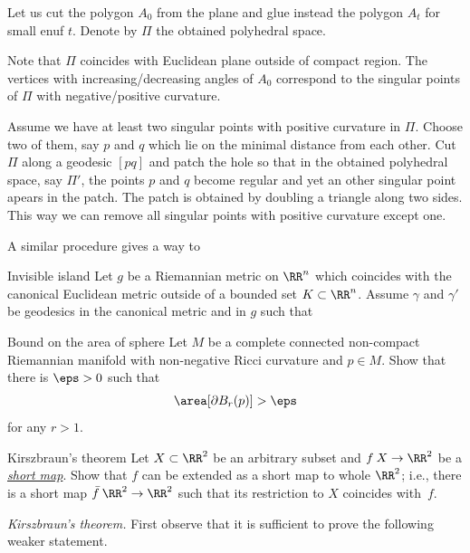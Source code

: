 Let us cut the polygon $A_0$ from the plane and glue instead the polygon $A_t$ for small enuf $t$.
Denote by $\Pi$ the obtained polyhedral space.

Note that 
$\Pi$ coincides with Euclidean plane outside of compact region.
The vertices with increasing/decreasing angles of $A_0$ 
correspond to the singular points of $\Pi$ with negative/positive curvature.

Assume we have at least two singular points with positive curvature in $\Pi$.
Choose two of them, 
say $p$ and $q$ which lie on the minimal distance from each other. 
Cut $\Pi$ along a geodesic $[pq]$
and patch the hole 
so that in the obtained polyhedral space, say $\Pi'$, 
the points $p$ and $q$ become regular and yet an other singular point apears in the patch. 
The patch is obtained by doubling a triangle along  two sides.
This way we can remove all singular points with positive curvature except one.

A similar procedure gives a way to 










\begin{pr}{}{Invisible island}
Let $g$ be a Riemannian metric on $\RR^n$ which coincides with the canonical Euclidean metric outside of a bounded set $K\subset \RR^n$.
Assume $\gamma$ and $\gamma'$ be geodesics in the canonical metric and in $g$
such that
\end{pr}





\begin{pr}{}{Bound on the area of sphere}
Let $M$ be a complete connected non-compact Riemannian manifold with non-negative Ricci curvature and $p\in M$.
Show that there is $\eps>0$ such that
$$\area [\partial B_r(p)]>\eps$$
for any $r>1$.
\end{pr}










\begin{pr}{}{Kirszbraun's theorem}\label{kirszbrun}
Let $X\subset\RR^2$ be an arbitrary subset and $f\:X\to\RR^2$ be a \hyperref[Short map]{\emph{short map}}.
Show that $f$ can be extended as a short map to whole $\RR^2$;
i.e., there is a short map $\bar f\:\RR^2\to\RR^2$ such that its restriction to $X$ coincides with~$f$.
\end{pr}
\textit{Kirszbraun's theorem.}
First observe that it is sufficient to prove the following weaker statement.

